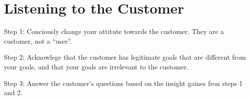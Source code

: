 \chapter{Listening to the Customer}

Step 1: Conciously change your attitute towards the customer. They are a
customer, not a ``user''.

Step 2: Acknowlege that the customer has legitimate goals that are
different from your goals, and that your goals are irrelevant to the
customer.

Step 3: Answer the customer's questions based on the insight gaines fron
steps 1 and 2.


